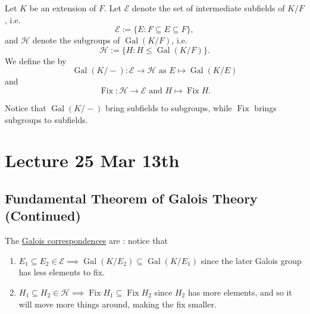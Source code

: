 \documentclass[notoc,notitlepage,nobib]{tufte-book}
\DeclareMathOperator{\Gal}{Gal}
\DeclareMathOperator{\Fix}{Fix}
\begin{document}
\begin{defn}\label{defn:galois_correspondences}
  Let $K$ be an extension of $F$. Let $\mathcal{E}$ denote the set of
  intermediate subfields of $K / F$, i.e.
  \begin{equation*}
    \mathcal{E} := \{ E : F \subseteq E \subseteq F \},
  \end{equation*}
  and $\mathcal{H}$ denote the subgroups of $\Gal(K / F)$, i.e.
  \begin{equation*}
    \mathcal{H} := \{ H : H \leq \Gal(K / F) \}.
  \end{equation*}
  We define the  by
  \begin{equation*}
    \Gal(K / -) : \mathcal{E} \to \mathcal{H} \text{ as } E \mapsto \Gal(K / E)
  \end{equation*}
  and
  \begin{equation*}
    \Fix : \mathcal{H} \to \mathcal{E} \text{ and } H \mapsto \Fix H.
  \end{equation*}
\end{defn}

\begin{note}
  Notice that $\Gal(K / -)$ bring subfields to subgroups, while $\Fix$ brings
  subgroups to subfields.
\end{note}



\chapter{Lecture 25 Mar 13th}%
\label{chp:lecture_25_mar_13th}

\section{Fundamental Theorem of Galois Theory (Continued)}%
\label{sec:fundamental_theorem_of_galois_theory_continued}

\begin{remark}
  The \hyperref[defn:galois_correspondences]{Galois correspondences} are
  : notice that
  \begin{enumerate}
    \item $E_1 \subseteq E_2 \in \mathcal{E} \implies \Gal(K / E_2) \subseteq \Gal(K
      / E_1)$ since the later Galois group has less elements to fix.
    \item $H_1 \subseteq H_2 \in \mathcal{H} \implies \Fix H_1 \subseteq \Fix
      H_2$ since $H_2$ has more elements, and so it will move more things
      around, making the fix smaller.
  \end{enumerate}
\end{remark}
\end{document}
